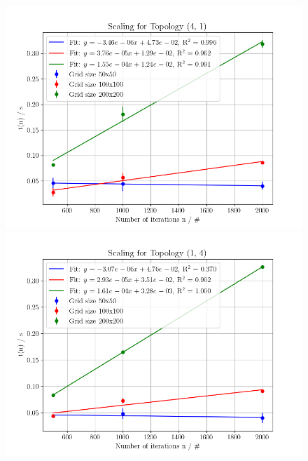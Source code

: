 \begin{figure}[H]
    \centering
    \begin{minipage}{0.48\textwidth}
        \centering
        \includegraphics[width=\linewidth]{../fig/lab1/scaling_topology_4x1.png}
    \end{minipage}%
    \hspace{0.02\textwidth}
    \begin{minipage}{0.48\textwidth}
        \centering
        \includegraphics[width=\linewidth]{../fig/lab1/scaling_topology_1x4.png}
    \end{minipage}
    
    \vspace{0.02\textwidth} %


\end{figure}
